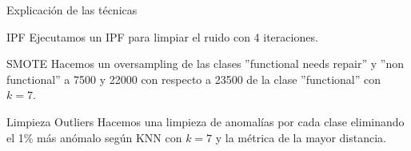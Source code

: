 \begin{frame}{Explicación de las técnicas}
	\vspace{10px}
	\pause
	\begin{block}{IPF}
		Ejecutamos un IPF para limpiar el ruido con 4 iteraciones.
	\end{block}
	\pause
	\begin{block}{SMOTE}
		Hacemos un oversampling de las clases ''functional needs repair'' y ''non functional'' a 7500 y 22000 con respecto a 23500 de la clase ''functional'' con $k=7$.
	\end{block}
	\pause
	\begin{block}{Limpieza Outliers}
		Hacemos una limpieza de anomalías por cada clase eliminando el 1\% más anómalo según KNN con $k=7$ y la métrica de la mayor distancia.
	\end{block}
\end{frame}

